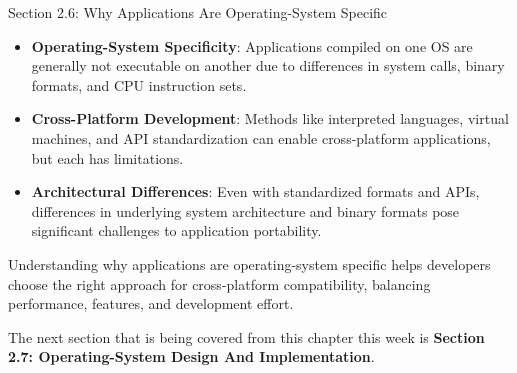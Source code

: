 \begin{notes}{Section 2.6: Why Applications Are Operating-System Specific}
\begin{highlight}
    \end{highlight}
    
    \begin{highlight}
    
    \begin{itemize}
        \item \textbf{Operating-System Specificity}: Applications compiled on one OS are generally not executable on another due to differences in system calls, binary formats, and CPU instruction sets.
        \item \textbf{Cross-Platform Development}: Methods like interpreted languages, virtual machines, and API standardization can enable cross-platform applications, but each has limitations.
        \item \textbf{Architectural Differences}: Even with standardized formats and APIs, differences in underlying system architecture and binary formats pose significant challenges to application portability.
    \end{itemize}
    
    Understanding why applications are operating-system specific helps developers choose the right approach for cross-platform compatibility, balancing performance, features, and development effort.
    
    \end{highlight}
\end{notes}

The next section that is being covered from this chapter this week is \textbf{Section 2.7: Operating-System Design And Implementation}.

